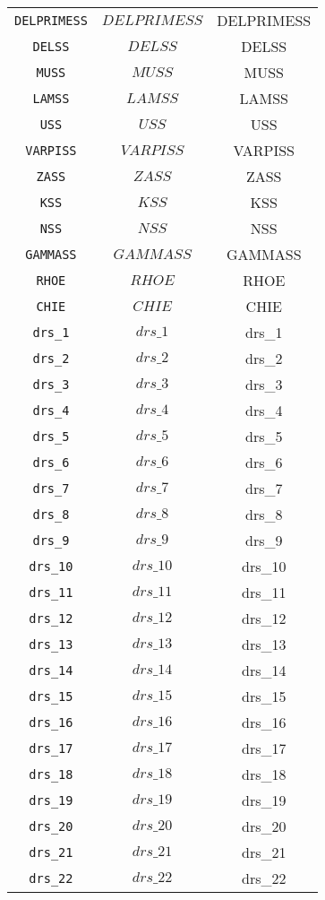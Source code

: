 \begin{center}
\begin{longtable}{ccc}
\texttt{DELPRIMESS} & $DELPRIMESS$ & DELPRIMESS\\
\texttt{DELSS} & $DELSS$ & DELSS\\
\texttt{MUSS} & $MUSS$ & MUSS\\
\texttt{LAMSS} & $LAMSS$ & LAMSS\\
\texttt{USS} & $USS$ & USS\\
\texttt{VARPISS} & $VARPISS$ & VARPISS\\
\texttt{ZASS} & $ZASS$ & ZASS\\
\texttt{KSS} & $KSS$ & KSS\\
\texttt{NSS} & $NSS$ & NSS\\
\texttt{GAMMASS} & $GAMMASS$ & GAMMASS\\
\texttt{RHOE} & $RHOE$ & RHOE\\
\texttt{CHIE} & $CHIE$ & CHIE\\
\texttt{drs\_1} & $drs\_1$ & drs\_1\\
\texttt{drs\_2} & $drs\_2$ & drs\_2\\
\texttt{drs\_3} & $drs\_3$ & drs\_3\\
\texttt{drs\_4} & $drs\_4$ & drs\_4\\
\texttt{drs\_5} & $drs\_5$ & drs\_5\\
\texttt{drs\_6} & $drs\_6$ & drs\_6\\
\texttt{drs\_7} & $drs\_7$ & drs\_7\\
\texttt{drs\_8} & $drs\_8$ & drs\_8\\
\texttt{drs\_9} & $drs\_9$ & drs\_9\\
\texttt{drs\_10} & $drs\_10$ & drs\_10\\
\texttt{drs\_11} & $drs\_11$ & drs\_11\\
\texttt{drs\_12} & $drs\_12$ & drs\_12\\
\texttt{drs\_13} & $drs\_13$ & drs\_13\\
\texttt{drs\_14} & $drs\_14$ & drs\_14\\
\texttt{drs\_15} & $drs\_15$ & drs\_15\\
\texttt{drs\_16} & $drs\_16$ & drs\_16\\
\texttt{drs\_17} & $drs\_17$ & drs\_17\\
\texttt{drs\_18} & $drs\_18$ & drs\_18\\
\texttt{drs\_19} & $drs\_19$ & drs\_19\\
\texttt{drs\_20} & $drs\_20$ & drs\_20\\
\texttt{drs\_21} & $drs\_21$ & drs\_21\\
\texttt{drs\_22} & $drs\_22$ & drs\_22\\

\end{longtable}
\end{center}
